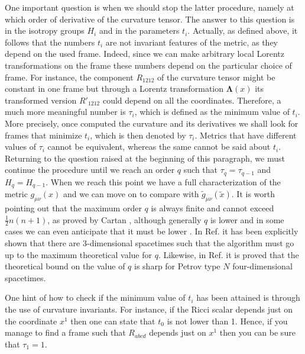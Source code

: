\documentclass[twocolumn,prd,aps,showpacs,showkeys,amsmath,amssymb]{revtex4-1}
\begin{document}
One important question is when we should stop the latter procedure, namely at which order of derivative of the curvature tensor. The answer to this question is in the isotropy groups $H_i$ and in the parameters $t_i$. Actually, as defined above, it follows that the numbers $t_i$ are not invariant features of the metric, as they depend on the used frame. Indeed, since we can make arbitrary local Lorentz transformations on the frame these numbers depend on the particular choice of frame. For instance, the component $R_{1212}$ of the curvature tensor might be constant in one frame but through a Lorentz transformation $\mathbf{\Lambda}(x)$ its transformed version $R'_{1212}$ could depend on all the coordinates. Therefore, a much more meaningful number is $\tau_i$, which is defined as the minimum value of $t_i$. More precisely, once computed the curvature and its derivatives we shall look for frames that minimize $t_i$, which is then denoted by $\tau_i$. Metrics that have different values of $\tau_i$ cannot be equivalent, whereas the same cannot be said about $t_i$.  Returning to the question raised at the beginning of this paragraph, we must continue the procedure until we reach an order $q$  such that $\tau_q = \tau_{q-1}$ and $H_{q} = H_{q-1}$. When we reach this point we have a full characterization of the metric $g_{\mu\nu}(x)$ and we can move on to compare with $\tilde{g}_{\mu\nu}(\tilde{x})$. It is worth pointing out that the maximum order $q$ is always finite and cannot exceed $\frac{1}{2}n(n+1)$, as proved by Cartan \cite{Cartan}, although generally $q$ is lower and in some cases we can even anticipate that it must be lower \cite{Karlhede}. In Ref. \cite{Milson:2012ry} it has been explicitly shown that there are 3-dimensional spacetimes such that the algorithm must go up to the maximum theoretical value for $q$. Likewise, in Ref.  \cite{Milson:2007ua} it is proved that the theoretical bound on the value of $q$ is sharp for Petrov type $N$ four-dimensional spacetimes.








One hint of how to check if the minimum value of $t_i$ has been attained is through the use of curvature invariants. For instance, if the Ricci scalar depends just on the coordinate $x^1$ then one can state that $t_0$ is not lower than 1.  Hence, if you manage to find a frame such that $R_{abcd}$ depends just on $x^1$ then you can be sure that $\tau_1=1$.
\end{document}
